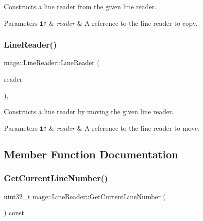 Constructs a line reader from the given line reader.


\begin{DoxyParams}[1]{Parameters}
\mbox{\tt in}  & {\em reader} & A reference to the line reader to copy. \\
\hline
\end{DoxyParams}
\hypertarget{classmage_1_1_line_reader_a0a9e80aabd15594f3e20bf7265e16c5e}{}\label{classmage_1_1_line_reader_a0a9e80aabd15594f3e20bf7265e16c5e} 
\subsubsection{\texorpdfstring{Line\+Reader()}{LineReader()}\hspace{0.1cm}{\footnotesize\ttfamily [3/3]}}
{\footnotesize\ttfamily mage\+::\+Line\+Reader\+::\+Line\+Reader (\begin{DoxyParamCaption}\item[{\hyperlink{classmage_1_1_line_reader}{Line\+Reader} \&\&}]{reader }\end{DoxyParamCaption})\hspace{0.3cm}{\ttfamily [protected]}, {\ttfamily [default]}}

Constructs a line reader by moving the given line reader.


\begin{DoxyParams}[1]{Parameters}
\mbox{\tt in}  & {\em reader} & A reference to the line reader to move. \\
\hline
\end{DoxyParams}


\subsection{Member Function Documentation}
\hypertarget{classmage_1_1_line_reader_a55f35bf4989ad109524da146639870d6}{}\label{classmage_1_1_line_reader_a55f35bf4989ad109524da146639870d6} 
\subsubsection{\texorpdfstring{Get\+Current\+Line\+Number()}{GetCurrentLineNumber()}}
{\footnotesize\ttfamily uint32\+\_\+t mage\+::\+Line\+Reader\+::\+Get\+Current\+Line\+Number (\begin{DoxyParamCaption}{ }\end{DoxyParamCaption}) const\hspace{0.3cm}{\ttfamily [protected]}}

